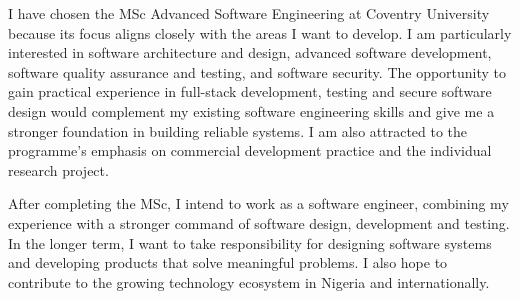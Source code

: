 \documentclass[11pt,a4paper]{article}
\begin{document}
I have chosen the MSc Advanced Software Engineering at Coventry University because its focus aligns closely with the areas I want to develop. I am particularly interested in software architecture and design, advanced software development, software quality assurance and testing, and software security. The opportunity to gain practical experience in full-stack development, testing and secure software design would complement my existing software engineering skills and give me a stronger foundation in building reliable systems. I am also attracted to the programme's emphasis on commercial development practice and the individual research project.

After completing the MSc, I intend to work as a software engineer, combining my experience with a stronger command of software design, development and testing. In the longer term, I want to take responsibility for designing software systems and developing products that solve meaningful problems. I also hope to contribute to the growing technology ecosystem in Nigeria and internationally.
\end{document}
